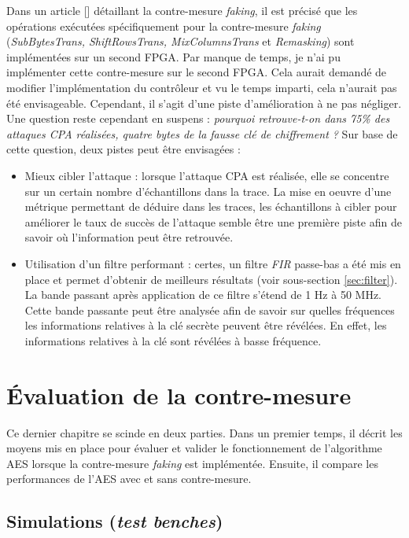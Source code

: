 \documentclass[oneside]{book}
\begin{document}
Dans un article [] détaillant la contre-mesure \textit{faking}, il est précisé que les opérations exécutées spécifiquement pour la contre-mesure \textit{faking} (\textit{SubBytesTrans, ShiftRowsTrans, MixColumnsTrans} et \textit{Remasking}) sont implémentées sur un second FPGA. Par manque de temps, je n'ai pu implémenter cette contre-mesure sur le second FPGA. Cela aurait demandé de modifier l'implémentation du contrôleur et vu le temps imparti, cela n'aurait pas été envisageable. Cependant, il s'agit d'une piste d'amélioration à ne pas négliger. Une question reste cependant en suspens : \textit{pourquoi retrouve-t-on dans 75\% des attaques CPA réalisées, quatre bytes de la fausse clé de chiffrement ?} Sur base de cette question, deux pistes peut être envisagées : 
\begin{itemize}
\item Mieux cibler l'attaque : lorsque l'attaque CPA est réalisée, elle se concentre sur un certain nombre d'échantillons dans la trace. La mise en oeuvre d'une métrique permettant de déduire dans les traces, les échantillons à cibler pour améliorer le taux de succès de l'attaque semble être une première piste afin de savoir où l'information peut être retrouvée.
\item Utilisation d'un filtre performant : certes, un filtre \textit{FIR} passe-bas a été mis en place et permet d'obtenir de meilleurs résultats (voir sous-section \ref{sec:filter}). La bande passant après application de ce filtre s'étend de 1 Hz à 50 MHz. Cette bande passante peut être analysée afin de savoir sur quelles fréquences les informations relatives à la clé secrète peuvent être révélées. En effet, les informations relatives à la clé sont révélées à basse fréquence.
\end{itemize}

\newpage


\chapter{Évaluation de la contre-mesure}
\label{chap:performances}

Ce dernier chapitre se scinde en deux parties. Dans un premier temps, il décrit les moyens mis en place pour évaluer et valider le fonctionnement de l'algorithme AES lorsque la contre-mesure \textit{faking} est implémentée. Ensuite, il compare les performances de l'AES avec et sans contre-mesure.

\section{Simulations (\textit{test benches})}
\label{sec:EvalSim}
\end{document}
